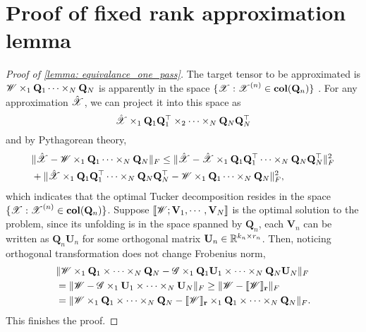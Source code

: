 \section{Proof of fixed rank approximation lemma}
\label{appendix: proof-fix-rank-lemma}
\begin{proof}[Proof of \ref{lemma: equivalance_one_pass}]
The target tensor to be approximated is $\T{W}\times_1 \mathbf{Q}_1 \cdots \times_N \mathbf{Q}_N$ is apparently in the space $\{ \T{X} : \T{X}^{(n)} 
\in \mathbf{col}(\mathbf{Q}_n) \}$ . For any approximation $\hat{\T{X}}$, we can project it into this space as
\[
\hat{\T{X}} \times_1 \mathbf{Q}_1\mathbf{Q}_1^\top \times_2 \cdots \times_N \mathbf{Q}_N\mathbf{Q}_N^\top
\]
and by Pythagorean theory,  
\begin{equation}
\begin{aligned}
& \|\hat{\T{X}} - \T{W}\times_1 \mathbf{Q}_1 \cdots \times_N \mathbf{Q}_N \|_F    \le  \|\hat{\T{X}} - \hat{\T{X}}\times_1 \mathbf{Q}_1\mathbf{Q}_1^\top  \cdots \times_N \mathbf{Q}_N\mathbf{Q}_N^\top \|_F^2 \\
&+ \|\hat{\T{X}}\times_1 \mathbf{Q}_1\mathbf{Q}_1^\top  \cdots \times_N \mathbf{Q}_N\mathbf{Q}_N^\top - \T{W}\times_1 \mathbf{Q}_1 \cdots \times_N \mathbf{Q}_N \|_F^2, 
\end{aligned}
\end{equation}
which indicates that the optimal Tucker decomposition resides in the space $\{ \T{X} : \T{X}^{(n)} 
\in \mathbf{col}(\mathbf{Q}_n) \}$.  Suppose $\llbracket \T{W}; \mathbf{V}_1, \cdots, \mathbf{V}_N  \rrbracket$
is the optimal solution to the problem, since its unfolding is in the space spanned by $\mathbf{Q}_n$, each $\mathbf{V}_n$ can be written as $\mathbf{Q}_n \mathbf{U}_n$ for some orthogonal matrix $\mathbf{U}_n\in \mathbb{R}^{k_n\times r_n}$. Then, noticing orthogonal transformation does  not change  Frobenius norm, 
\begin{equation}
\begin{aligned}
&\| \T{W} \times_1 \mathbf{Q}_1 \times \cdots \times_N \mathbf{Q}_N - \T{G} \times_1  \mathbf{Q}_1\mathbf{U}_1 \times \cdots \times_N   \mathbf{Q}_N\mathbf{U}_N\|_F  \\
 & = \|\T{W}-\T{G} \times_1 \mathbf{U}_1\times \cdots \times_N \mathbf{U}_N\|_F \ge  \|\T{W} -\llbracket \T{W} \rrbracket_\mathbf{r}\|_F\\
 & =  \|\T{W}\times_1\mathbf{Q}_1\times \cdots \times_N \mathbf{Q}_N -\llbracket \T{W} \rrbracket_\mathbf{r} \times_1 \mathbf{Q}_1 \times \cdots \times_N\mathbf{Q}_N\|_F. 
\end{aligned}
\end{equation}
This finishes the proof. 
\end{proof}
